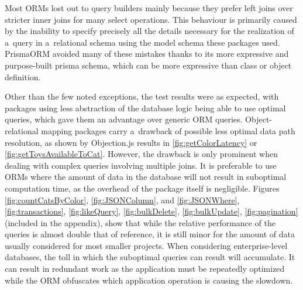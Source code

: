 Most ORMs lost out to query builders mainly because they prefer left joins over
stricter inner joins for many select operations. This behaviour is primarily
caused by the inability to specify precisely all the details necessary for the
realization of a~query in a~relational schema using the model schema these
packages used. PrismaORM avoided many of these mistakes thanks to its more
expressive and purpose-built prisma schema, which can be more expressive than
class or object definition.

Other than the few noted exceptions, the test results were as expected, with
packages using less abstraction of the database logic being able to use optimal
queries, which gave them an advantage over generic ORM queries.
Object-relational mapping packages carry a~drawback of possible less optimal
data path resolution, as shown by Objection.js results in
\autoref{fig:getColorLatency} or \autoref{fig:getToysAvailableToCat}. However,
the drawback is only prominent when dealing with complex queries involving
multiple joins. It is preferable to use ORMs where the amount of data in the
database will not result in suboptimal computation time, as the overhead of the
package itself is negligible. Figures \ref{fig:countCatsByColor},
\ref{fig:JSONColumn}, and \ref{fig:JSONWhere}, \ref{fig:transactions},
\ref{fig:likeQuery}, \ref{fig:bulkDelete}, \ref{fig:bulkUpdate},
\ref{fig:pagination} (included in the appendix), show that while the relative
performance of the queries is almost double that of reference, it is still minor
for the amount of data usually considered for most smaller projects. When
considering enterprise-level databases, the toll in which the suboptimal queries
can result will accumulate. It can result in redundant work as the application
must be repeatedly optimized while the ORM obfuscates which application
operation is causing the slowdown. 
